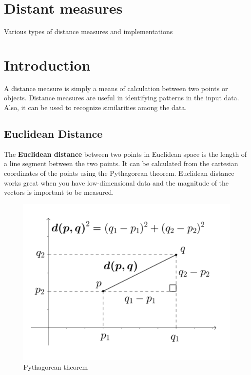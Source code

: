 \documentclass[11pt]{article}
\author{Karthik Kumar}
\date{\today}
\title{}
\begin{document}
\tableofcontents

\section{Distant measures}
\label{sec:orgc1093ab}
Various types of distance measures and implementations

\section{Introduction}
\label{sec:org82220dd}
A distance measure is simply a means of calculation between two points
or objects. Distance measures are useful in identifying patterns in the
input data. Also, it can be used to recognize similarities among the
data.

\subsection{Euclidean Distance}
\label{sec:org9b56179}
The \textbf{Euclidean distance} between two points in Euclidean space is the
length of a line segment between the two points. It can be calculated
from the cartesian coordinates of the points using the Pythagorean
theorem. Euclidean distance works great when you have low-dimensional
data and the magnitude of the vectors is important to be measured.\\

\begin{figure}[htbp]
\centering
\includegraphics[width=.9\linewidth]{./data/pythagorean.png}
\caption{\label{fig:org2684f3e}Pythagorean theorem}
\end{figure}
\end{document}
